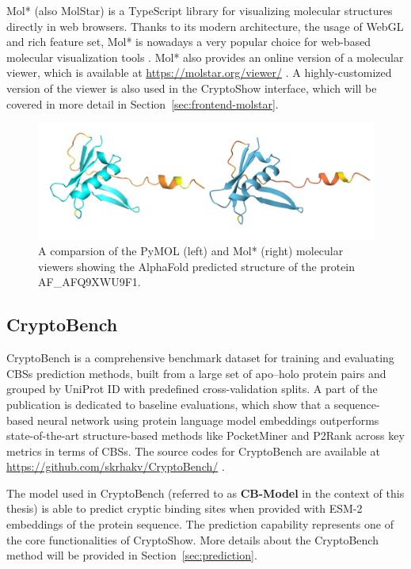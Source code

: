 Mol* (also MolStar) is a TypeScript library for visualizing molecular structures directly in web browsers. Thanks to its modern architecture, the usage of WebGL and rich feature set, Mol* is nowadays a very popular choice for web-based molecular visualization tools \cite{sehnal2018mol}. Mol* also provides an online version of a molecular viewer, which is available at \url{https://molstar.org/viewer/} \cite{sehnal2021mol}. A highly-customized version of the viewer is also used in the CryptoShow interface, which will be covered in more detail in Section~\ref{sec:frontend-molstar}.

\begin{figure}[ht]
    \centering
    \includegraphics[width=\textwidth]{img/pymol-molstar.png}
    \caption{A comparsion of the PyMOL (left) and Mol* (right) molecular viewers showing the AlphaFold predicted structure of the protein AF\_AFQ9XWU9F1.}
    \label{fig:pymol-molstar}
\end{figure}

\subsection{CryptoBench}
\label{sec:cryptobench}

CryptoBench is a comprehensive benchmark dataset for training and evaluating CBSs prediction methods, built from a large set of apo–holo protein pairs and grouped by UniProt ID with predefined cross-validation splits. A part of the publication is dedicated to baseline evaluations, which show that a sequence-based neural network using protein language model embeddings outperforms state-of-the-art structure-based methods like PocketMiner \cite{meller2023predicting} and P2Rank \cite{krivak2018p2rank} across key metrics in terms of CBSs. The source codes for CryptoBench are available at \url{https://github.com/skrhakv/CryptoBench/} \cite{vskrhak2025cryptobench}.

The model used in CryptoBench (referred to as \textbf{CB-Model} in the context of this thesis) is able to predict cryptic binding sites when provided with ESM-2 embeddings \cite{lin2022language} of the protein sequence. The prediction capability represents one of the core functionalities of CryptoShow. More details about the CryptoBench method will be provided in Section~\ref{sec:prediction}.


